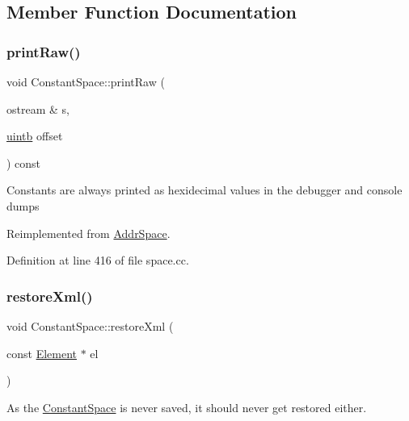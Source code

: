 \subsection{Member Function Documentation}
\mbox{\label{class_constant_space_aed7e05a3024887280f12e0d7082c769e}} 
\subsubsection{\texorpdfstring{printRaw()}{printRaw()}}
{\footnotesize\ttfamily void Constant\+Space\+::print\+Raw (\begin{DoxyParamCaption}\item[{ostream \&}]{s,  }\item[{\mbox{\hyperlink{types_8h_a2db313c5d32a12b01d26ac9b3bca178f}{uintb}}}]{offset }\end{DoxyParamCaption}) const\hspace{0.3cm}{\ttfamily [virtual]}}

Constants are always printed as hexidecimal values in the debugger and console dumps 

Reimplemented from \mbox{\hyperlink{class_addr_space_a76819b70cd6b6ae8601ac1821f86b929}{Addr\+Space}}.



Definition at line 416 of file space.\+cc.

\mbox{\label{class_constant_space_ae29b82af12a38637ded7c4b1c57d7367}} 
\subsubsection{\texorpdfstring{restoreXml()}{restoreXml()}}
{\footnotesize\ttfamily void Constant\+Space\+::restore\+Xml (\begin{DoxyParamCaption}\item[{const \mbox{\hyperlink{class_element}{Element}} $\ast$}]{el }\end{DoxyParamCaption})\hspace{0.3cm}{\ttfamily [virtual]}}

As the \mbox{\hyperlink{class_constant_space}{Constant\+Space}} is never saved, it should never get restored either. 

